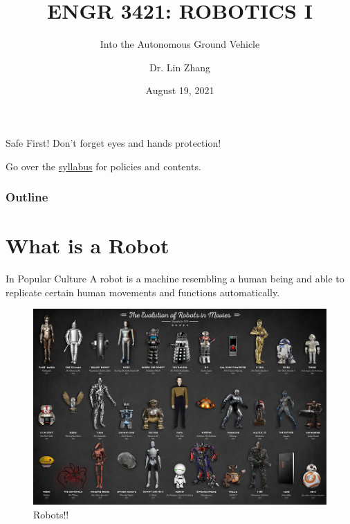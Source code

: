 \documentclass[12pt,letterpaper]{beamer}
\title[Robotics I]
{ENGR 3421: ROBOTICS I}
\subtitle{Into the Autonomous Ground Vehicle}
\author[Zhang, Lin]
{Dr. Lin Zhang}
\institute[UCA] %
{
  Department of Physics and Astronomy\\
  University of Central Arkansas
}
\date[Robotics1 2021] %
{August 19, 2021}
\begin{document}
\frame{\titlepage}
\begin{frame}
    \begin{alertblock}{Safe First!}
        Don't forget eyes and hands protection!
    \end{alertblock}
    Go over the \href{https://github.com/pbdUCA/robotics1-2021/blob/main/syllabus-robotics1.pdf}{syllabus} for policies and contents.
\end{frame}

\begin{frame}
\frametitle{Outline}
\tableofcontents
\end{frame}


\section{What is a Robot}

\begin{frame}{In Popular Culture}
    A robot is a machine resembling a human being and able to replicate certain human movements and functions automatically.
    \begin{figure}
        \includegraphics{evolution-of-robots-in-movies.jpeg}
        \caption{Robots!!}
    \end{figure}
\end{frame}
\end{document}

